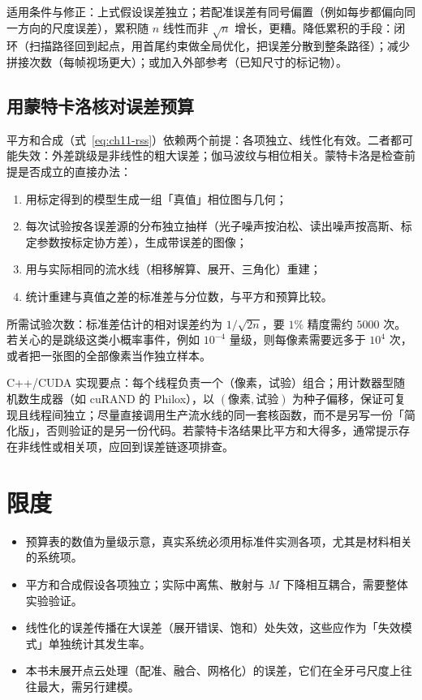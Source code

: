 适用条件与修正：上式假设误差独立；若配准误差有同号偏置（例如每步都偏向同一方向的尺度误差），累积随 $n$ 线性而非 $\sqrt n$ 增长，更糟。降低累积的手段：闭环（扫描路径回到起点，用首尾约束做全局优化，把误差分散到整条路径）；减少拼接次数（每帧视场更大）；或加入外部参考（已知尺寸的标记物）。

\subsection{用蒙特卡洛核对误差预算}

平方和合成（式~\eqref{eq:ch11-rss}）依赖两个前提：各项独立、线性化有效。二者都可能失效：外差跳级是非线性的粗大误差；伽马波纹与相位相关。蒙特卡洛是检查前提是否成立的直接办法：
\begin{enumerate}
  \item 用标定得到的模型生成一组「真值」相位图与几何；
  \item 每次试验按各误差源的分布独立抽样（光子噪声按泊松、读出噪声按高斯、标定参数按标定协方差），生成带误差的图像；
  \item 用与实际相同的流水线（相移解算、展开、三角化）重建；
  \item 统计重建与真值之差的标准差与分位数，与平方和预算比较。
\end{enumerate}
所需试验次数：标准差估计的相对误差约为 $1/\sqrt{2n}$，要 $1\%$ 精度需约 $5000$ 次。若关心的是跳级这类小概率事件，例如 $10^{-4}$ 量级，则每像素需要远多于 $10^4$ 次，或者把一张图的全部像素当作独立样本。

C++/CUDA 实现要点：每个线程负责一个（像素，试验）组合；用计数器型随机数生成器（如 cuRAND 的 Philox），以 $(\text{像素},\text{试验})$ 为种子偏移，保证可复现且线程间独立；尽量直接调用生产流水线的同一套核函数，而不是另写一份「简化版」，否则验证的是另一份代码。若蒙特卡洛结果比平方和大得多，通常提示存在非线性或相关项，应回到误差链逐项排查。

\section{限度}
\label{sec:ch11-limits}

\begin{itemize}
  \item 预算表的数值为量级示意，真实系统必须用标准件实测各项，尤其是材料相关的系统项。
  \item 平方和合成假设各项独立；实际中离焦、散射与 $M$ 下降相互耦合，需要整体实验验证。
  \item 线性化的误差传播在大误差（展开错误、饱和）处失效，这些应作为「失效模式」单独统计其发生率。
  \item 本书未展开点云处理（配准、融合、网格化）的误差，它们在全牙弓尺度上往往最大，需另行建模。
\end{itemize}

